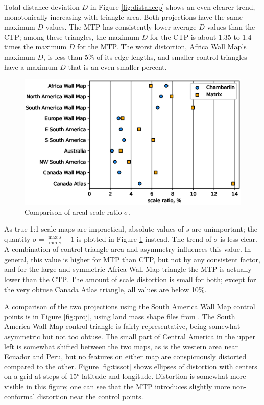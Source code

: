 \documentclass[]{interact}
\begin{document}
Total distance deviation $D$ in Figure \ref{fig:distancep} shows an even clearer
trend, monotonically increasing with triangle area. Both projections have the
same maximum $D$ values. The MTP has consistently lower average $D$ values than
the CTP; among these triangles, the maximum $D$ for the CTP is about
1.35 to 1.4 times the maximum $D$ for the MTP. The worst distortion,
Africa Wall Map's maximum $D$, is less than 5\% of its edge lengths, and
smaller control triangles have a maximum $D$ that is an even smaller percent.

\begin{figure}
  \includegraphics[width=\textwidth]{scaleplot}
  \caption{Comparison of areal scale ratio $\sigma$.}
  \label{fig:scalep}
\end{figure}

As true 1:1 scale maps are impractical, absolute values of $s$ are unimportant;
the quantity $\sigma = \frac{\max s}{\min s} - 1$ is plotted in Figure
\ref{fig:scalep} instead. The trend of $\sigma$ is less clear. A combination of
control triangle area and asymmetry influences this value. In general, this
value is higher for MTP than CTP, but not by any consistent factor,
and for the large and symmetric Africa Wall Map triangle the MTP is
actually lower than the CTP. The amount of scale distortion is small for both;
except for the very obtuse Canada Atlas triangle, all values are below 10\%.

A comparison of the two projections using the South America Wall Map control
points is in Figure \ref{fig:proj}, using land mass shape files from
\citet{natearth}. The South America Wall Map control triangle is fairly
representative, being somewhat asymmetric but not too obtuse. The small part of
Central America in the upper left is somewhat shifted between the two maps, as
is the western area near Ecuador and Peru, but no features on either map are
conspicuously distorted compared to the other. Figure \ref{fig:tissot} shows
ellipses of distortion with centers on a grid at steps of 15° latitude and
longitude.
Distortion is somewhat more visible in this figure; one can see that the
MTP introduces slightly more non-conformal distortion near the control points.
\end{document}
